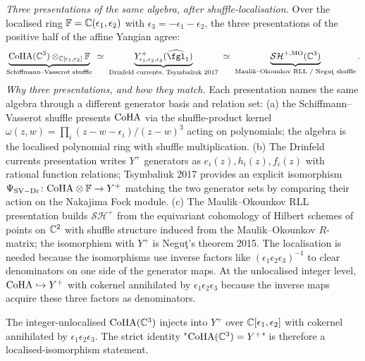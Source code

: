 \begin{theorem}
\label{wn:thm:spine-coha-miki}
\emph{Three presentations of the same algebra, after shuffle-localisation.}
Over the localised ring $\mathbb{F} = \mathbb{C}(\epsilon_1, \epsilon_2)$ with
$\epsilon_3 = -\epsilon_1 - \epsilon_2$, the three presentations of the
positive half of the affine Yangian agree:
\[
\underbrace{\CoHA(\CC^3) \otimes_{\CC[\epsilon_1,
\epsilon_2]} \mathbb{F}}_{\text{Schiffmann--Vasserot shuffle}}
\;\simeq\;
\underbrace{Y^+_{\epsilon_1, \epsilon_2, \epsilon_3}
(\widehat{\fgl}_1)}_{\text{Drinfeld currents, Tsymbaliuk 2017}}
\;\simeq\;
\underbrace{\mathcal{SH}^{+, \mathrm{MO}}(\CC^3)}_{\text{Maulik--Okounkov
RLL / Negu\c t shuffle}}.
\]
\emph{Why three presentations, and how they match.} Each presentation
names the same algebra through a different generator basis and
relation set: (a) the Schiffmann--Vasserot shuffle presents $\mathrm{CoHA}$
via the shuffle-product kernel $\omega(z, w)
= \prod_i (z - w - \epsilon_i)/(z - w)^3$ acting on polynomials; the
algebra is the localised polynomial ring with shuffle multiplication.
(b) The Drinfeld currents presentation writes $Y^+$ generators as
$e_i(z), h_i(z), f_i(z)$ with rational function relations; Tsymbaliuk
2017 provides an explicit isomorphism
$\Psi_{\mathrm{SV-Dr}}\colon \mathrm{CoHA} \otimes \mathbb{F} \to Y^+$
matching the two generator sets by comparing their action on the
Nakajima Fock module. (c) The Maulik--Okounkov RLL presentation builds
$\mathcal{SH}^+$ from the equivariant cohomology of Hilbert schemes of
points on $\mathbb{C}^2$ with shuffle structure induced from the
Maulik--Okounkov $R$-matrix; the isomorphism with $Y^+$ is Negu\c t's
theorem 2015. The localisation is needed because the isomorphisms
use inverse factors like $(\epsilon_1 \epsilon_2 \epsilon_3)^{-1}$ to
clear denominators on one side of the generator maps. At the
unlocalised integer level, $\mathrm{CoHA} \hookrightarrow Y^+$ with
cokernel annihilated by $\epsilon_1 \epsilon_2 \epsilon_3$ because
the inverse maps acquire these three factors as denominators.

The integer-unlocalised $\mathrm{CoHA}(\mathbb{C}^3)$ injects into
$Y^+$ over $\mathbb{C}[\epsilon_1, \epsilon_2]$ with cokernel annihilated by
$\epsilon_1 \epsilon_2 \epsilon_3$. The strict identity
"$\mathrm{CoHA}(\mathbb{C}^3) = Y^+$" is therefore a localised-isomorphism
statement.


\end{theorem}
